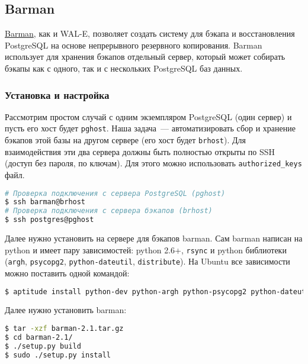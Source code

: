 \subsection{Barman}

\href{http://www.pgbarman.org/}{Barman}, как и WAL-E, позволяет создать систему для бэкапа и восстановления PostgreSQL на основе непрерывного резервного копирования. Barman использует для хранения бэкапов отдельный сервер, который может собирать бэкапы как с одного, так и с нескольких PostgreSQL баз данных.

\subsubsection{Установка и настройка}

Рассмотрим простом случай с одним экземпляром PostgreSQL (один сервер) и пусть его хост будет \lstinline!pghost!. Наша задача~--- автоматизировать сбор и хранение бэкапов этой базы на другом сервере (его хост будет \lstinline!brhost!). Для взаимодействия эти два сервера должны быть полностью открыты по SSH (доступ без пароля, по ключам). Для этого можно использовать \lstinline!authorized_keys! файл.

\begin{lstlisting}[language=Bash,label=lst:barman1,caption=Проверка подключения по SSH]
# Проверка подключения с сервера PostgreSQL (pghost)
$ ssh barman@brhost
# Проверка подключения с сервера бэкапов (brhost)
$ ssh postgres@pghost
\end{lstlisting}

Далее нужно установить на сервере для бэкапов barman. Сам barman написан на python и имеет пару зависимостей: python 2.6+, \lstinline!rsync! и python библиотеки (\lstinline!argh!, \lstinline!psycopg2!, \lstinline!python-dateutil!, \lstinline!distribute!). На Ubuntu все зависимости можно поставить одной командой:

\begin{lstlisting}[language=Bash,label=lst:barman2,caption=Установка зависимостей barman]
$ aptitude install python-dev python-argh python-psycopg2 python-dateutil rsync python-setuptools
\end{lstlisting}

Далее нужно установить barman:

\begin{lstlisting}[language=Bash,label=lst:barman3,caption=Установка barman]
$ tar -xzf barman-2.1.tar.gz
$ cd barman-2.1/
$ ./setup.py build
$ sudo ./setup.py install
\end{lstlisting}

